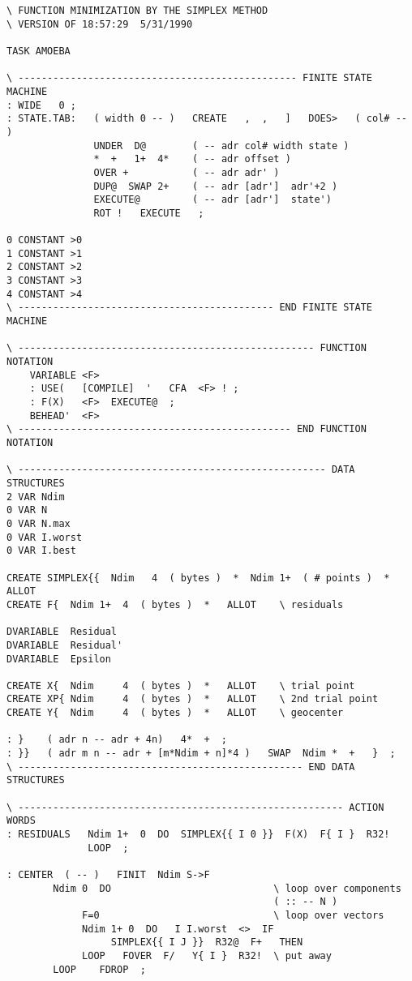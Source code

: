 \begin{lstlisting}
\ FUNCTION MINIMIZATION BY THE SIMPLEX METHOD
\ VERSION OF 18:57:29  5/31/1990

TASK AMOEBA

\ ------------------------------------------------ FINITE STATE MACHINE
: WIDE   0 ;
: STATE.TAB:   ( width 0 -- )   CREATE   ,  ,   ]   DOES>   ( col# -- )
               UNDER  D@        ( -- adr col# width state )
               *  +   1+  4*    ( -- adr offset )
               OVER +           ( -- adr adr' )
               DUP@  SWAP 2+    ( -- adr [adr']  adr'+2 )
               EXECUTE@         ( -- adr [adr']  state')
               ROT !   EXECUTE   ;

0 CONSTANT >0
1 CONSTANT >1
2 CONSTANT >2
3 CONSTANT >3
4 CONSTANT >4
\ -------------------------------------------- END FINITE STATE MACHINE

\ --------------------------------------------------- FUNCTION NOTATION
    VARIABLE <F>
    : USE(   [COMPILE]  '   CFA  <F> ! ;
    : F(X)   <F>  EXECUTE@  ;
    BEHEAD'  <F>
\ ----------------------------------------------- END FUNCTION NOTATION

\ ----------------------------------------------------- DATA STRUCTURES
2 VAR Ndim
0 VAR N
0 VAR N.max
0 VAR I.worst
0 VAR I.best

CREATE SIMPLEX{{  Ndim   4  ( bytes )  *  Ndim 1+  ( # points )  *  ALLOT
CREATE F{  Ndim 1+  4  ( bytes )  *   ALLOT    \ residuals

DVARIABLE  Residual
DVARIABLE  Residual'
DVARIABLE  Epsilon

CREATE X{  Ndim     4  ( bytes )  *   ALLOT    \ trial point
CREATE XP{ Ndim     4  ( bytes )  *   ALLOT    \ 2nd trial point
CREATE Y{  Ndim     4  ( bytes )  *   ALLOT    \ geocenter

: }    ( adr n -- adr + 4n)   4*  +  ;
: }}   ( adr m n -- adr + [m*Ndim + n]*4 )   SWAP  Ndim *  +   }  ;
\ ------------------------------------------------- END DATA STRUCTURES

\ -------------------------------------------------------- ACTION WORDS
: RESIDUALS   Ndim 1+  0  DO  SIMPLEX{{ I 0 }}  F(X)  F{ I }  R32!
              LOOP  ;

: CENTER  ( -- )   FINIT  Ndim S->F
        Ndim 0  DO                            \ loop over components
                                              ( :: -- N )
             F=0                              \ loop over vectors
             Ndim 1+ 0  DO   I I.worst  <>  IF
                  SIMPLEX{{ I J }}  R32@  F+   THEN
             LOOP   FOVER  F/   Y{ I }  R32!  \ put away
        LOOP    FDROP  ;


\end{lstlisting}
